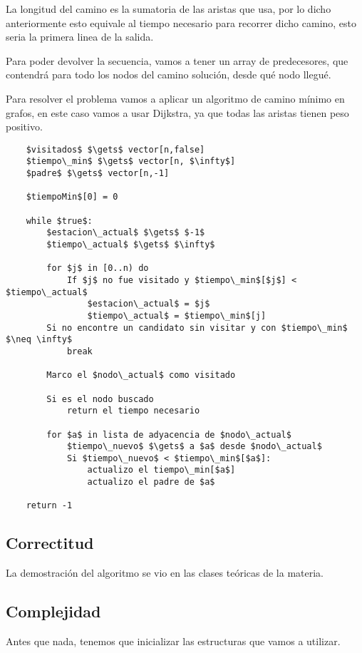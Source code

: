 La longitud del camino es la sumatoria de las aristas que usa, por lo dicho anteriormente esto equivale al tiempo necesario para recorrer dicho camino, esto seria la primera linea de la salida.

Para poder devolver la secuencia, vamos a tener un array de predecesores, que contendrá para todo los nodos del camino solución, desde qué nodo llegué.

Para resolver el problema vamos a aplicar un algoritmo de camino mínimo en grafos, en este caso vamos a usar Dijkstra, ya que todas las aristas tienen peso positivo.

\begin{lstlisting}
    $visitados$ $\gets$ vector[n,false]
    $tiempo\_min$ $\gets$ vector[n, $\infty$]
    $padre$ $\gets$ vector[n,-1]

    $tiempoMin$[0] = 0

    while $true$:
        $estacion\_actual$ $\gets$ $-1$
        $tiempo\_actual$ $\gets$ $\infty$

        for $j$ in [0..n) do
            If $j$ no fue visitado y $tiempo\_min$[$j$] < $tiempo\_actual$
                $estacion\_actual$ = $j$
                $tiempo\_actual$ = $tiempo\_min$[j]
        Si no encontre un candidato sin visitar y con $tiempo\_min$ $\neq \infty$
            break

        Marco el $nodo\_actual$ como visitado

        Si es el nodo buscado
            return el tiempo necesario

        for $a$ in lista de adyacencia de $nodo\_actual$
            $tiempo\_nuevo$ $\gets$ a $a$ desde $nodo\_actual$
            Si $tiempo\_nuevo$ < $tiempo\_min$[$a$]:
                actualizo el tiempo\_min[$a$]
                actualizo el padre de $a$

    return -1
   \end{lstlisting}

\subsection{Correctitud}

La demostración del algoritmo se vio en las clases teóricas de la materia.

\subsection{Complejidad}
Antes que nada, tenemos que inicializar las estructuras que vamos a utilizar.

